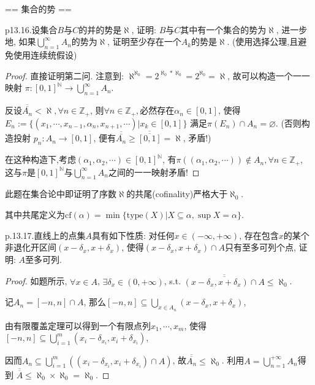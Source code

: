 == 集合的势 ==

p13.16.设集合$B$与$C$的并的势是$\aleph$, 证明: $B$与$C$其中有一个集合的势为$\aleph$, 
进一步地, 如果$\bigcup\limits_{n=1}^{\infty} A_n$的势为$\aleph$, 
证明至少存在一个$A_k$的势是$\aleph$.
(使用选择公理,且避免使用连续统假设)

\begin{proof}
    直接证明第二问.
    注意到: $\aleph ^ {\aleph_0}=2^{\aleph_0*\aleph_0} = 2^{\aleph_0} = \aleph$,
    故可以构造一个一一映射 $\pi \colon [0,1]^{\mathbb{N}} \to \bigcup\limits_{n=1}^{\infty} A_n$.
    
    反设$\overline{\overline{A_n}} < \aleph, \forall n \in \mathbb{Z}_+$, 
    则$\forall n \in \mathbb{Z}_+,$必然存在$\alpha_n \in [0,1]$, 使得
    $E_n := \{(x_1,\cdots ,x_{n-1},\alpha_n, x_{n+1}, \cdots ) | x_k \in [0,1]\}$ 
    满足$\pi{(E_n)} \cap A_n = \varnothing$.
    (否则构造投射 $p_n\colon A_n \to [0,1]$, 便有$\overline{\overline{A_n}} \geq \overline{\overline{[0,1]}} = \aleph$, 矛盾!)
    
    在这种构造下,考虑$(\alpha_1, \alpha_2, \cdots ) \in [0,1]^{\mathbb{N}}$, 
    有$\pi((\alpha_1, \alpha_2, \cdots))\notin A_n, \forall n\in \mathbb{Z}_+$, 
    这与$\pi$是$[0,1]^{\mathbb{N}} $与$ \bigcup\limits_{n=1}^{\infty} A_n$之间的一一映射矛盾!
\end{proof}
\begin{remark}
    此题在集合论中即证明了序数$\aleph$的共尾(cofinality)严格大于$\aleph_0$.

    其中共尾定义为$\mathrm{cf}(\alpha) = \min\{\mathrm{type} (X)|X\subseteq \alpha, \sup X = \alpha\} .$
\end{remark}

p.13.17.直线上的点集$A$具有如下性质: 对任何$x\in (-\infty, +\infty)$, 
存在包含$x$的某个非退化开区间$(x-\delta_x, x+\delta_x)$, 
使得$(x-\delta_x, x+\delta_x)\cap A$只有至多可列个点, 证明: $A$至多可列.
\begin{proof}
    如题所示, $\forall x\in A$, $\exists \delta_x \in (0,+\infty)$, 
    s.t. $\overline{\overline{(x-\delta_x,x+\delta_x) \cap A} }\leq \aleph_0$.

    记$A_n= [-n,n] \cap A$, 那么$[-n,n] \subseteq  \bigcup\limits_{x\in A_n} (x-\delta_x, x+\delta_x)$,
    
    由有限覆盖定理可以得到一个有限点列$x_1,\cdots,x_m$, 使得
    $[-n,n] \subseteq \bigcup\limits_{i=1}^m {(x_i-\delta_{x_i},x_i+\delta_{x_i})}$,
    
    因而$A_n \subseteq \bigcup\limits_{i=1}^m ((x_i-\delta_{x_i},x_i+\delta_{x_i}) \cap A)$,
    故$\overline{\overline{A_n}} \leq \aleph_0$. 
    利用$A = \bigcup\limits_{n=1}^{+\infty} A_n$得到
    $\overline{\overline{A}} \leq \aleph_0 \times \aleph_0 = \aleph_0$.
\end{proof}


